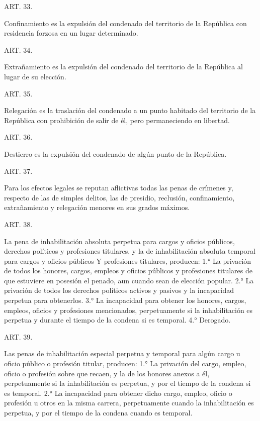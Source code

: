     ART. 33.

    Confinamiento es la expulsión del condenado del territorio de la República con residencia forzosa en un lugar determinado.





    ART. 34.

    Extrañamiento es la expulsión del condenado del territorio de la República al lugar de su elección.





    ART. 35.

    Relegación es la traslación del condenado a un punto habitado del territorio de la República con prohibición de salir de él, pero permaneciendo en libertad.



    ART. 36.

    Destierro es la expulsión del condenado de algún punto de la República.




    ART. 37.

    Para los efectos legales se reputan aflictivas todas las penas de crímenes y, respecto de las de simples delitos, las de presidio, reclusión, confinamiento, extrañamiento y relegación menores en sus grados máximos.


    ART. 38.

    La pena de inhabilitación absoluta perpetua para cargos y oficios públicos, derechos políticos y profesiones titulares, y la de inhabilitación absoluta temporal para cargos y oficios públicos Y profesiones titulares, producen:
    1.° La privación de todos los honores, cargos, empleos y oficios públicos y profesiones titulares de que estuviere en posesión el penado, aun cuando sean de elección popular.
    2.° La privación de todos los derechos políticos activos y pasivos y la incapacidad perpetua para obtenerlos.
    3.° La incapacidad para obtener los honores, cargos, empleos, oficios y profesiones mencionados, perpetuamente si la inhabilitación es perpetua y durante el tiempo de la condena si es temporal.
    4.° Derogado.




    ART. 39.

    Las penas de inhabilitación especial perpetua y temporal para algún cargo u oficio público o profesión titular, producen:
    1.° La privación del cargo, empleo, oficio o profesión sobre que recaen, y la de los honores anexos a él, perpetuamente si la inhabilitación es perpetua, y por el tiempo de la condena si es temporal.
    2.° La incapacidad para obtener dicho cargo, empleo, oficio o profesión u otros en la misma carrera, perpetuamente cuando la inhabilitación es perpetua, y por el tiempo de la condena cuando es temporal.

